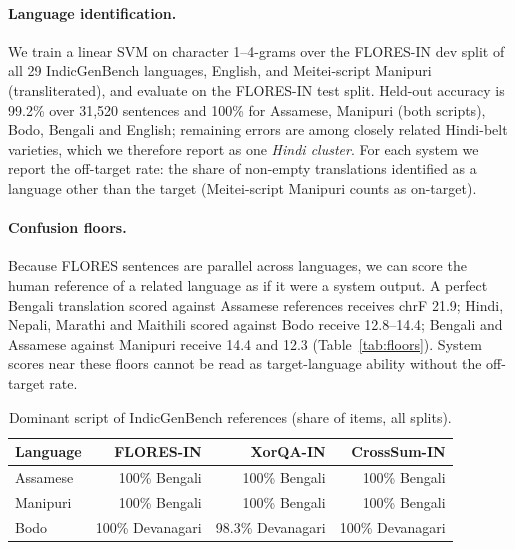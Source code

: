 \documentclass[11pt]{article}
\begin{document}
\paragraph{Language identification.} We train a linear SVM on character 1--4-grams over the
FLORES-IN dev split of all 29 IndicGenBench languages, English, and Meitei-script Manipuri
(transliterated), and evaluate on the FLORES-IN test split. Held-out accuracy is 99.2\% over
31{,}520 sentences and 100\% for Assamese, Manipuri (both scripts), Bodo, Bengali and English;
remaining errors are among closely related Hindi-belt varieties, which we therefore report as
one \emph{Hindi cluster}. For each system we report the off-target rate: the share of non-empty
translations identified as a language other than the target (Meitei-script Manipuri counts as
on-target).

\paragraph{Confusion floors.} Because FLORES sentences are parallel across languages, we can score
the human reference of a related language as if it were a system output. A perfect Bengali
translation scored against Assamese references receives chrF 21.9; Hindi, Nepali, Marathi and
Maithili scored against Bodo receive 12.8--14.4; Bengali and Assamese against Manipuri receive
14.4 and 12.3 (Table~\ref{tab:floors}). System scores near these floors cannot be read as
target-language ability without the off-target rate.

\begin{table}[t]\centering\small
\begin{tabular}{lrrr}\toprule
Language & FLORES-IN & XorQA-IN & CrossSum-IN \\\midrule
Assamese & 100\% Bengali & 100\% Bengali & 100\% Bengali \\
Manipuri & 100\% Bengali & 100\% Bengali & 100\% Bengali \\
Bodo & 100\% Devanagari & 98.3\% Devanagari & 100\% Devanagari \\\bottomrule
\end{tabular}
\caption{Dominant script of IndicGenBench references (share of items, all splits).}\label{tab:audit}
\end{table}
\end{document}

